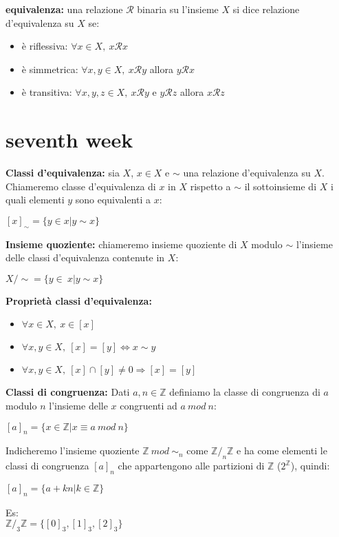 \documentclass[12pt, a4paper]{article}
\begin{document}
\textbf{equivalenza:} una relazione $\mathcal{R}$ binaria su l'insieme $X$ si dice relazione d'equivalenza su $X$ se:
\begin{itemize}
    \item è riflessiva: $\forall x\in X,\ x\mathcal{R}x$
    \item è simmetrica: $\forall x,y\in X,\ x\mathcal{R}y$ allora $y\mathcal{R}x$
    \item è transitiva: $\forall x,y,z\in X,\ x\mathcal{R}y$ e $y\mathcal{R}z$ allora $x\mathcal{R}z$
\end{itemize}

\newpage
\section{seventh week}

\textbf{Classi d'equivalenza:} sia $X$, $x\in X$ e $\sim$ una relazione d'equivalenza su $X$. Chiameremo classe
d'equivalenza di $x$ in $X$ rispetto a $\sim$ il sottoinsieme di $X$ i quali elementi $y$ sono equivalenti a $x$:
\begin{center}
    $[x]_{\sim}=\{y\in x| y\sim x\}$
\end{center}

\textbf{Insieme quoziente:} chiameremo insieme quoziente di $X$ modulo $\sim$ l'insieme delle classi d'equivalenza
contenute in $X$:
\begin{center}
    $X/\sim =\{ y\in\ x| y\sim x\}$
\end{center}

\textbf{Proprietà classi d'equivalenza:}
\begin{itemize}
    \item $\forall x\in X,\ x\in [x]$
    \item $\forall x,y\in X,\ [x]=[y] \Leftrightarrow x\sim y$
    \item $\forall x,y\in X,\ [x]\cap [y]\neq 0\Rightarrow [x]=[y]$
\end{itemize}

\textbf{Classi di congruenza:} Dati $a,n\in\mathbb{Z}$ definiamo la classe di congruenza di $a$ modulo
$n$ l'insieme delle $x$ congruenti ad $a\ mod\ n$:
\begin{center}
    $[a]_{n}=\{x\in\mathbb{Z}|x\equiv a\ mod\ n\}$
\end{center}
Indicheremo l'insieme quoziente $\mathbb{Z}\ mod\ \sim_{n}$ come $\mathbb{Z}/_{n}\mathbb{Z}$ e ha 
come elementi le classi di congruenza $[a]_{n}$ che appartengono alle partizioni di $\mathbb{Z}$
($2^{\mathbb{Z}}$), quindi:
\begin{center}
    $[a]_{n}=\{a+kn|k\in\mathbb{Z}\}$
\end{center}
Es:\\ $\mathbb{Z}/_{3}\mathbb{Z}=\{[0]_{3},[1]_{3},[2]_{3}\}$
\end{document}
